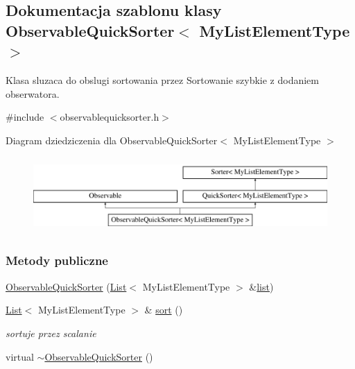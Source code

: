 \hypertarget{class_observable_quick_sorter}{\subsection{Dokumentacja szablonu klasy Observable\-Quick\-Sorter$<$ My\-List\-Element\-Type $>$}
\label{class_observable_quick_sorter}
}


Klasa sluzaca do obslugi sortowania przez Sortowanie szybkie z dodaniem obserwatora.  




{\ttfamily \#include $<$observablequicksorter.\-h$>$}

Diagram dziedziczenia dla Observable\-Quick\-Sorter$<$ My\-List\-Element\-Type $>$\begin{figure}[H]
\begin{center}
\leavevmode
\includegraphics[height=2.926829cm]{class_observable_quick_sorter}
\end{center}
\end{figure}
\subsubsection*{Metody publiczne}
\begin{DoxyCompactItemize}
\item 
\hyperlink{class_observable_quick_sorter_a217751e25c07354b33d9e417bcc4f0c4}{Observable\-Quick\-Sorter} (\hyperlink{class_list}{List}$<$ My\-List\-Element\-Type $>$ \&\hyperlink{class_quick_sorter_a60a7a4772c958f256962294418e83fe4}{list})
\item 
\hyperlink{class_list}{List}$<$ My\-List\-Element\-Type $>$ \& \hyperlink{class_observable_quick_sorter_aa32fd1f6c024b3993c4d43302d0702f3}{sort} ()
\begin{DoxyCompactList}\small\item\em sortuje przez scalanie \end{DoxyCompactList}\item 
virtual \hyperlink{class_observable_quick_sorter_a346874659e31256462d9cf8caab53a6e}{$\sim$\-Observable\-Quick\-Sorter} ()
\end{DoxyCompactItemize}
